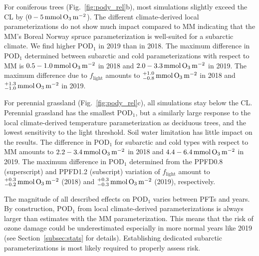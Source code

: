 \documentclass[bg, manuscript]{copernicus}
\begin{document}
For coniferous trees (Fig.~\ref{fig:pody_rel}b), most simulations slightly exceed the CL by ($0-5\,\unit{mmol\,\chem{O_3}\,m^{-2}}$). The different climate-derived local parameterizations do not show much impact compared to MM indicating that the MM's Boreal Norway spruce parameterization is well-suited for a subarctic climate. We find higher $\mathrm{POD_1}$ in 2019 than in 2018. The maximum difference in $\mathrm{POD_1}$ determined between subarctic and cold parameterizations with respect to MM is $0.5-1.0\,\unit{mmol\,\chem{O_3}\,m^{-2}}$ in 2018 and $2.0-3.3\,\unit{mmol\,\chem{O_3}\,m^{-2}}$ in 2019. The maximum difference due to $f_\mathrm{light}$ amounts to $^{+1.0}_{-0.8}\,\unit{mmol\,\chem{O_3}\,m^{-2}}$ in 2018 and $^{+1.3}_{-1.0}\,\unit{mmol\,\chem{O_3}\,m^{-2}}$ in 2019.

For perennial grassland (Fig.~\ref{fig:pody_rel}c), all simulations stay below the CL. Perennial grassland has the smallest $\mathrm{POD_1}$, but a similarly large response to the local climate-derived temperature parameterization as deciduous trees, and the lowest sensitivity to the light threshold. Soil water limitation has little impact on the results. The difference in $\mathrm{POD_1}$ for subarctic and cold types with respect to MM amounts to $2.2-3.4\,\unit{mmol\,\chem{O_3}\,m^{-2}}$ in 2018 and $4.4-6.4\,\unit{mmol\,\chem{O_3}\,m^{-2}}$ in 2019. The maximum difference in $\mathrm{POD_1}$ determined from the PPFD0.8 (superscript) and PPFD1.2 (subscript) variation of $f_\mathrm{light}$ amount to $^{+0.3}_{-0.2}\,\unit{mmol\,\chem{O_3}\,m^{-2}}$ (2018) and $^{+0.3}_{-0.3}\,\unit{mmol\,\chem{O_3}\,m^{-2}}$ (2019), respectively.

The magnitude of all described effects on $\mathrm{POD_1}$ varies between PFTs and years. By construction, $\mathrm{POD_1}$ from local climate-derived parameterizations is always larger than estimates with the MM parameterization. This means that the risk of ozone damage could be underestimated especially in more normal years like 2019 (see Section~\ref{subsec:stats} for details). Establishing dedicated subarctic parameterizations is most likely required to properly assess risk.
\end{document}
